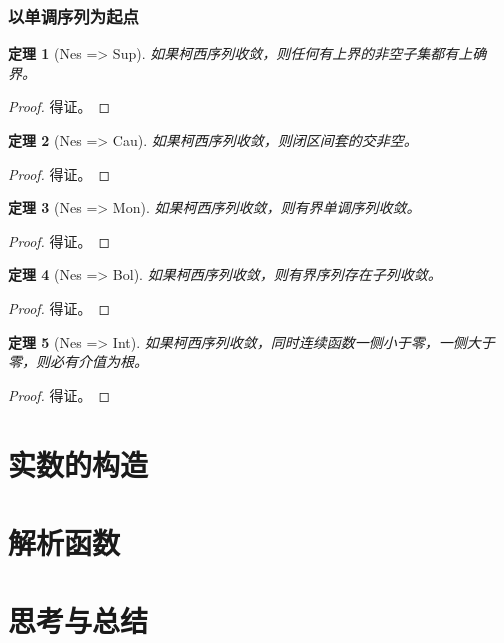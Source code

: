 \documentclass[a4paper,12pt]{article}
\newtheorem{theorem}{定理}
\begin{document}
\subsubsection{以单调序列为起点}

\begin{theorem}[Nes => Sup]
  如果柯西序列收敛，则任何有上界的非空子集都有上确界。
\end{theorem}
\begin{proof}
    得证。
\end{proof}

\begin{theorem}[Nes => Cau]
  如果柯西序列收敛，则闭区间套的交非空。
\end{theorem}
\begin{proof}
    得证。
\end{proof}

\begin{theorem}[Nes => Mon]
  如果柯西序列收敛，则有界单调序列收敛。
\end{theorem}
\begin{proof}
    得证。
\end{proof}

\begin{theorem}[Nes => Bol]
  如果柯西序列收敛，则有界序列存在子列收敛。
\end{theorem}
\begin{proof}
    得证。
\end{proof}

\begin{theorem}[Nes => Int]
  如果柯西序列收敛，同时连续函数一侧小于零，一侧大于零，则必有介值为根。
\end{theorem}
\begin{proof}
    得证。
\end{proof}

\section{实数的构造}

\section{解析函数}

\section{思考与总结}
\end{document}
